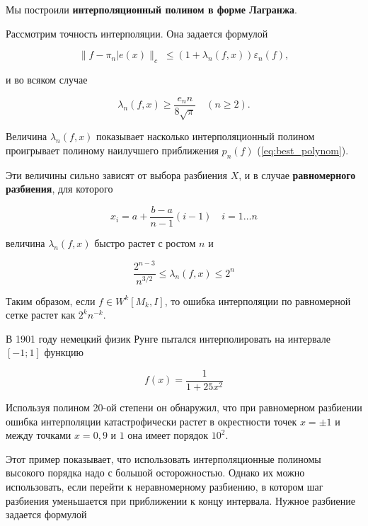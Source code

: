 Мы построили \textbf{интерполяционный полином в форме Лагранжа}. 

Рассмотрим точность интерполяции. Она задается формулой 

\begin{equation}
\parallel f - \pi_n| e(x) \parallel_c \; \leq (1+ \lambda_n(f, x))\varepsilon_n(f),
\end{equation}

и во всяком случае 

\begin{equation}
\lambda_n(f, x) \geq \frac{e_n n}{8 \sqrt{\pi}} \quad (n \geq 2).
\end{equation}

Величина $\lambda_n(f, x)$ показывает насколько интерполяционный полином проигрывает полиному наилучшего приближения $p_n(f)$ (\ref{eq:best_polynom}).


Эти величины сильно зависят от выбора разбиения $X$, и в случае \textbf{равномерного разбиения}, для которого

\begin{equation} \label{eq:2.24}
x_i = a + \frac{b-a}{n-1}(i-1) \quad i = 1\dots n
\end{equation}

величина $\lambda_n(f, x)$ быстро растет с ростом $n$ и


\begin{equation}
\frac{2^{n-3}}{n^{3/2}} \leq \lambda_n(f, x) \leq 2^n
\end{equation} 


Таким образом, если  $f \in W^k[M_k, I]$, то ошибка интерполяции по равномерной сетке растет как $2^kn^{-k}$.

В 1901 году немецкий физик Рунге пытался интерполировать на интервале $[-1; 1]$ функцию

\begin{equation}
f(x) = \frac{1}{1+25x^2}
\end{equation}

Используя полином 20-ой степени он обнаружил, что при равномерном разбиении ошибка интерполяции катастрофически растет в окрестности точек $x = \pm 1$ и между точками $x = 0,9$ и $1$ она имеет порядок $10^2$.

Этот пример показывает, что использовать интерполяционные полиномы высокого порядка надо с большой осторожностью. Однако их можно использовать, если перейти к неравномерному разбиению, в котором шаг разбиения уменьшается при приближении к концу интервала.
Нужное разбиение задается формулой 

